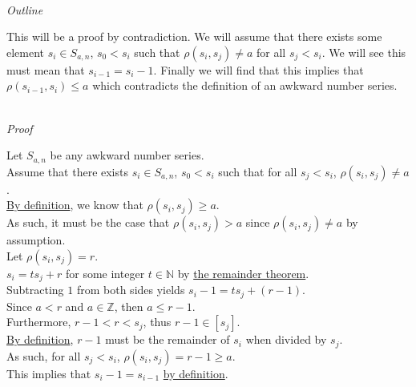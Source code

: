 \documentclass[a4paper,12pt]{article}
\begin{document}
\noindent \\
\textit{Outline}

\noindent This will be a proof by contradiction. We will assume that there exists some element $s_i \in S_{a,n}$, $s_0 < s_i$ such that $\rho(s_i, s_j) \neq a$ for all $s_j < s_i$. We will see this must mean that $s_{i - 1} = s_i - 1$. Finally we will find that this implies that $\rho(s_{i - 1}, s_i) \leq a$ which contradicts the definition of an awkward number series.

\noindent \\
\textit{Proof}

\noindent Let $S_{a, n}$ be any awkward number series.\\

\noindent Assume that there exists $s_i \in S_{a, n}$, $s_0 < s_i$ such that for all $s_j < s_i$, $\rho(s_i, s_j) \neq a$.\\

\noindent \hyperlink{definition:awkward_number_series}{By definition}, we know that $\rho(s_i, s_j) \geq a$.\\

\noindent As such, it must be the case that $\rho(s_i, s_j) > a$ since $\rho(s_i, s_j) \neq a$ by assumption.\\

\noindent Let $\rho(s_i, s_j) = r$.\\

\noindent $s_i = ts_j + r$ for some integer $t \in \mathbb{N}$ by \hyperlink{theorem:remainder_theorem}{the remainder theorem}.\\

\noindent Subtracting $1$ from both sides yields $s_i - 1 = ts_j + (r - 1)$.\\

\noindent Since $a < r$ and $a \in \mathbb{Z}$, then $a \leq r - 1$.\\

\noindent Furthermore, $r - 1 < r < s_j$, thus $r - 1 \in [s_j]$.\\

\noindent \hyperlink{theorem:remainder_theorem}{By definition}, $r - 1$ must be the remainder of $s_i$ when divided by $s_j$.\\

\noindent As such, for all $s_j < s_i$, $\rho(s_i, s_j) = r - 1 \geq a$.\\

\noindent This implies that $s_i - 1 = s_{i - 1}$ \hyperlink{definition:awkward_number_series}{by definition}.\\
\end{document}
